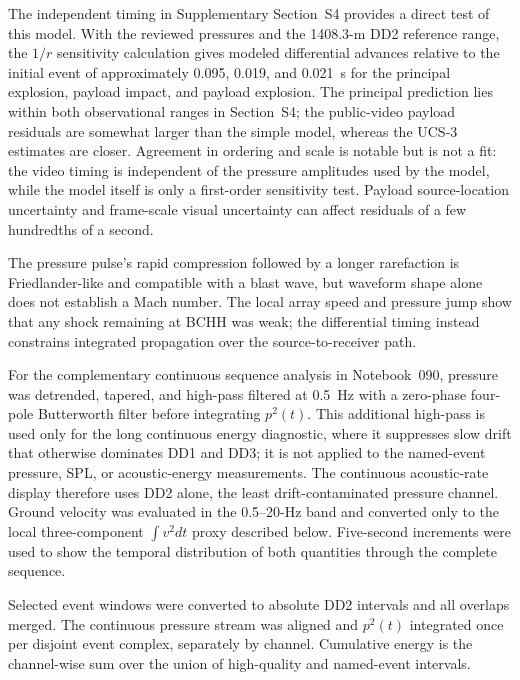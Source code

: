 \documentclass[]{seismica}
\begin{document}
The independent timing in Supplementary Section~S4 provides a direct test of
this model. With the reviewed pressures and the 1408.3-m DD2 reference range,
the $1/r$ sensitivity calculation gives modeled differential advances relative
to the initial event of approximately 0.095, 0.019, and 0.021~s for the
principal explosion, payload impact, and payload explosion. The principal
prediction lies within both observational ranges in Section~S4; the
public-video payload residuals are somewhat larger than the simple model,
whereas the UCS-3 estimates are closer. Agreement in ordering and scale is
notable but is not a fit: the video timing is independent of the pressure
amplitudes used by the model, while the model itself is only a first-order
sensitivity test. Payload source-location uncertainty and frame-scale visual
uncertainty can affect residuals of a few hundredths of a second.

The pressure pulse's rapid compression followed by a longer rarefaction is
Friedlander-like and compatible with a blast wave, but waveform shape alone
does not establish a Mach number. The local array speed and pressure jump show
that any shock remaining at BCHH was weak; the differential timing instead
constrains integrated propagation over the source-to-receiver path.

For the complementary continuous sequence analysis in Notebook~090,
pressure was detrended, tapered, and high-pass filtered at 0.5~Hz with a
zero-phase four-pole Butterworth filter before integrating $p^2(t)$. This
additional high-pass is used only for the long continuous energy diagnostic,
where it suppresses slow drift that otherwise dominates DD1 and DD3; it is not
applied to the named-event pressure, SPL, or acoustic-energy measurements.
The continuous acoustic-rate display therefore uses DD2 alone, the least
drift-contaminated pressure channel. Ground velocity was evaluated in the
0.5--20-Hz band and converted only to the local three-component
$\int v^2dt$ proxy described below. Five-second increments were used to show
the temporal distribution of both quantities through the complete sequence.

Selected event windows were converted to absolute DD2 intervals and all
overlaps merged. The continuous pressure stream was aligned and $p^2(t)$
integrated once per disjoint event complex, separately by channel. Cumulative
energy is the channel-wise sum over the union of high-quality and named-event
intervals.
\end{document}
